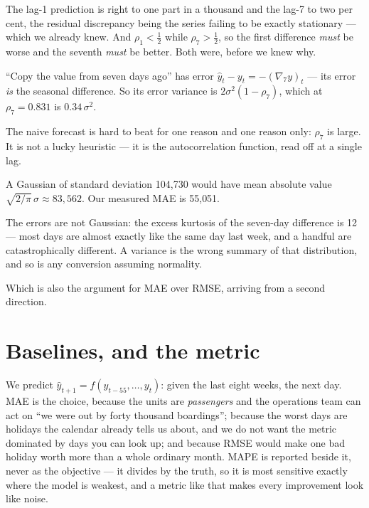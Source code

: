 \documentclass[11pt,a4paper]{article}
\begin{document}
The lag-1 prediction is right to one part in a thousand and the lag-7 to two
per cent, the residual discrepancy being the series failing to be exactly
stationary --- which we already knew. And $\rho_1 < \tfrac12$ while
$\rho_7 > \tfrac12$, so the first difference \emph{must} be worse and the
seventh \emph{must} be better. Both were, before we knew why.

\begin{keybox}[title={And now the naive forecast is explained}]
``Copy the value from seven days ago'' has error
$\hat y_t - y_t = -(\nabla_7 y)_t$ --- its error \emph{is} the seasonal
difference. So its error variance is $2\sigma^2(1-\rho_7)$, which at
$\rho_7 = 0.831$ is $0.34\,\sigma^2$.

The naive forecast is hard to beat for one reason and one reason only:
$\rho_7$ is large. It is not a lucky heuristic --- it is the autocorrelation
function, read off at a single lag.
\end{keybox}

\begin{failbox}[title={Failure condition --- an MAE inferred from a Gaussian that is not there}]
A Gaussian of standard deviation 104{,}730 would have mean absolute value
$\sqrt{2/\pi}\,\sigma \approx 83{,}562$. Our measured MAE is 55{,}051.

The errors are not Gaussian: the excess kurtosis of the seven-day difference is
12 --- most days are almost exactly like the same day last week, and a handful
are catastrophically different. A variance is the wrong summary of that
distribution, and so is any conversion assuming normality.

Which is also the argument for MAE over RMSE, arriving from a second
direction.
\end{failbox}

\section{Baselines, and the metric}

We predict $\hat y_{t+1} = f(y_{t-55},\dots,y_t)$: given the last eight weeks,
the next day. MAE is the choice, because the units are \emph{passengers} and
the operations team can act on ``we were out by forty thousand boardings'';
because the worst days are holidays the calendar already tells us about, and we
do not want the metric dominated by days you can look up; and because RMSE
would make one bad holiday worth more than a whole ordinary month. MAPE is
reported beside it, never as the objective --- it divides by the truth, so it is
most sensitive exactly where the model is weakest, and a metric like that makes
every improvement look like noise.
\end{document}
